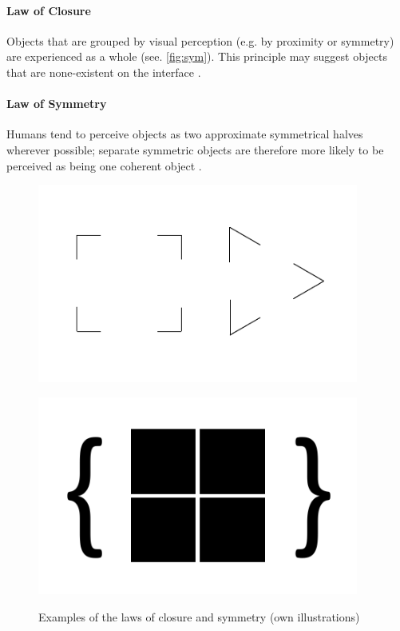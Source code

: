 \paragraph*{Law of Closure} Objects that are grouped by visual perception (e.g. by proximity or symmetry) are experienced as a whole (see. \ref{fig:sym}). This principle may suggest objects that are none-existent on the interface \parencite[see.][]{Stevenson.n.y.}.
\paragraph*{Law of Symmetry} Humans tend to perceive objects as two approximate symmetrical halves wherever possible; separate symmetric objects are therefore more likely to be perceived as being one coherent object \parencite[see.][]{Soegaard.n.y.}.
\begin{figure}[H] 
    \begin{minipage}[b]{.5\linewidth}
        \centering\includegraphics[width=0.94\textwidth]{img/closure.pdf}
        \label{fig:clo}
    \end{minipage}%
    \begin{minipage}[b]{.5\linewidth}
        \centering\includegraphics[width=0.94\textwidth]{img/symmetry.pdf}
        \label{fig:sym}
    \end{minipage}
    \caption[Laws of Closure and Symmetry]{Examples of the laws of closure and symmetry (own illustrations)}\label{fig:law2}
\end{figure}
